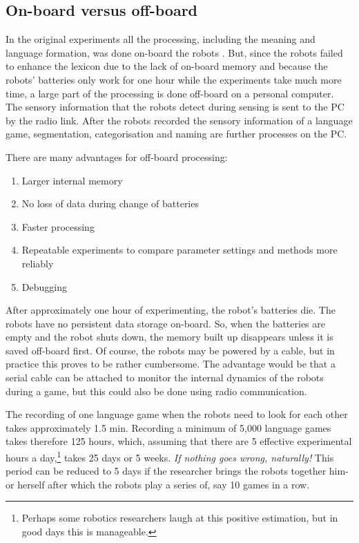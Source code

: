 \subsection{On-board versus off-board}\label{s:lg:offboard}

In the original experiments all the processing, including the meaning and language formation, was done on-board the robots \citep{steelsvogt:1997}. But, since the robots failed to enhance the lexicon due to the lack of on-board memory and because the robots' batteries only work for one hour while the experiments take much more time, a large part of the processing is done off-board on a personal computer. The sensory information that the robots detect during sensing is sent to the PC by the radio link. After the robots recorded the sensory information of a language game, segmentation, categorisation and naming are further processes on the PC.

There are many advantages for off-board processing:

\begin{enumerate}
\item Larger internal memory
\item No loss of data during change of batteries
\item Faster processing
\item Repeatable experiments to compare parameter settings and methods more reliably
\item Debugging
\end{enumerate}


After approximately one hour of experimenting, the robot's batteries die. The robots have no persistent data storage on-board. So, when the batteries are empty and the robot shuts down, the memory built up disappears unless it is saved off-board first. Of course, the robots may be powered by a cable, but in practice this proves to be rather cumbersome. The advantage would be that a serial cable can be attached to monitor the internal dynamics of the robots during a game, but this could also be done using radio communication.

The recording of one language game when the robots need to look for each other takes approximately 1.5 min. Recording a minimum of 5,000 language games takes therefore 125 hours, which, assuming that there are 5 effective experimental hours a day,\footnote{Perhaps some robotics researchers laugh at this positive estimation, but in good days this is manageable.} takes 25 days or 5 weeks. {\em If nothing goes wrong, naturally!} This period can be reduced to 5 days if the researcher brings the robots together him- or herself after which the robots play a series of, say 10 games in a row. 

